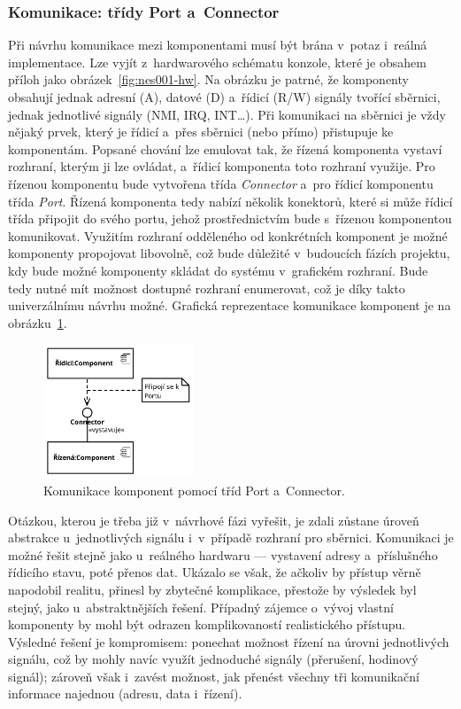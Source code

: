 \subsubsection{Komunikace: třídy Port a~Connector}
\label{sec:port-connector}
Při návrhu komunikace mezi komponentami musí být brána v~potaz i~reálná implementace. Lze vyjít z~hardwarového schématu konzole, které je obsahem příloh jako obrázek~\ref{fig:nes001-hw}. Na obrázku je patrné, že komponenty obsahují jednak adresní (A), datové (D) a~řídicí  (R/W) signály tvořící sběrnici, jednak jednotlivé signály (NMI, IRQ, INT\dots). Při komunikaci na sběrnici je vždy nějaký prvek, který je řídicí a~přes sběrnici (nebo přímo) přistupuje ke komponentám. Popsané chování lze emulovat tak, že řízená komponenta vystaví rozhraní, kterým ji lze ovládat, a~řídicí komponenta toto rozhraní využije. Pro řízenou komponentu bude vytvořena třída \emph{Connector} a~pro řídicí komponentu třída \emph{Port}. Řízená komponenta tedy nabízí několik konektorů, které si může řídicí třída připojit do svého portu, jehož prostřednictvím bude s~řízenou komponentou komunikovat. Využitím rozhraní odděleného od konkrétních komponent je možné komponenty propojovat libovolně, což bude důležité v~budoucích fázích projektu, kdy bude možné komponenty skládat do systému v~grafickém rozhraní. Bude tedy nutné mít možnost dostupné rozhraní enumerovat, což je díky takto univerzálnímu návrhu možné. Grafická reprezentace komunikace komponent je na obrázku~\ref{fig:navrh-komunikace-komponent}.

\begin{figure}[ht!]
	\centering
	\includegraphics[width=0.4\textwidth]{images/port_connector.pdf}
	\caption{Komunikace komponent pomocí tříd Port a~Connector.}\label{fig:navrh-komunikace-komponent}
\end{figure}

Otázkou, kterou je třeba již v~návrhové fázi vyřešit, je zdali zůstane úroveň abstrakce u~jednotlivých signálu i~v~případě rozhraní pro sběrnici. Komunikaci je možné řešit stejně jako u~reálného hardwaru --- vystavení adresy a~příslušného řídicího stavu, poté přenos dat. Ukázalo se však, že ačkoliv by přístup věrně napodobil realitu, přinesl by zbytečné komplikace, přestože by výsledek byl stejný, jako u~abstraktnějších řešení. Případný zájemce o~vývoj vlastní komponenty by mohl být odrazen komplikovaností realistického přístupu. Výsledné řešení je kompromisem: ponechat možnost řízení na úrovni jednotlivých signálu, což by mohly navíc využít jednoduché signály (přerušení, hodinový signál); zároveň však i~zavést možnost, jak přenést všechny tři komunikační informace najednou (adresu, data i~řízení).


